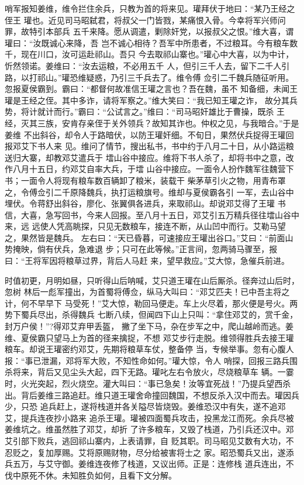 哨军报知姜维，维令拦住余兵，只教为首的将来见。瓘拜伏于地曰：“某乃王经之侄王
瓘也。近见司马昭弑君，将叔父一门皆戮，某痛恨入骨。今幸将军兴师问罪，故特引本部兵
五千来降。愿从调遣，剿除奸党，以报叔父之恨。”维大喜，谓瓘曰：“汝既诚心来降，吾
岂不诚心相待？吾军中所患者，不过粮耳。今有粮车数千，现在川口，汝可运赴祁山。吾只
今去取祁山寨也。”瓘心中大喜，以为中计，忻然领诺。姜维曰：“汝去运粮，不必用五千
人，但引三千人去，留下二千人引路，以打祁山。”瓘恐维疑惑，乃引三千兵去了。维令傅
佥引二千魏兵随征听用。忽报夏侯霸到。霸曰：“都督何故准信王瓘之言也？吾在魏，虽不
知备细，未闻王瓘是王经之侄。其中多诈，请将军察之。”维大笑曰：“我已知王瓘之诈，
故分其兵势，将计就计而行。”霸曰：“公试言之。”维曰：“司马昭奸雄比于曹操，既杀
王经，灭其三族，安肯存亲侄于关外领兵？故知其诈也。仲权之见，与我暗合。”于是姜维
不出斜谷，却令人于路暗伏，以防王瓘奸细。不旬日，果然伏兵捉得王瓘回报邓艾下书人来
见。维问了情节，搜出私书，书中约于八月二十日，从小路运粮送归大寨，却教邓艾遣兵于
墵山谷中接应。维将下书人杀了，却将书中之意，改作八月十五日，约邓艾自率大兵，于墵
山谷中接应。一面令人扮作魏军往魏营下书；一面令人将现有粮车数百辆卸了粮米，装载干
柴茅草引火之物，用青布罩之，令傅佥引二千原降魏兵，执打运粮旗号。维却与夏侯霸各引
一军，去山谷中埋伏。令蒋舒出斜谷，廖化、张翼俱各进兵，来取祁山。却说邓艾得了王瓘
书信，大喜，急写回书，今来人回报。至八月十五日，邓艾引五万精兵径往墵山谷中来，远
远使人凭高眺探，只见无数粮车，接连不断，从山凹中而行。艾勒马望之，果然皆是魏兵。
左右曰：“天已昏暮，可速接应王瓘出谷口。”艾曰：“前面山势掩映，倘有伏兵，急难退
步；只可在此等候。”正言间，忽两骑马骤至，报曰：“王将军因将粮草过界，背后人马赶
来，望早救应。”艾大惊，急催兵前进。

时值初更，月明如昼，只听得山后呐喊，艾只道王瓘在山后厮杀。径奔过山后时，忽树
林后一彪军撞出，为首蜀将傅佥，纵马大叫曰：“邓艾匹夫！已中吾主将之计，何不早早下
马受死！”艾大惊，勒回马便走。车上火尽着，那火便是号火。两势下蜀兵尽出，杀得魏兵
七断八续，但闻四下山上只叫：“拿住邓艾的，赏千金，封万户侯！”?得邓艾弃甲丢盔，
撇了坐下马，杂在步军之中，爬山越岭而逃。姜维、夏侯霸只望马上为首的径来擒捉，不想
邓艾步行走脱。维领得胜兵去接王瓘粮车。却说王瓘密约邓艾，先期将粮草车仗，整备停
当，专候举事。忽有心腹人报：“事已泄漏，邓将军大败，不知性命如何。”瓘大惊，令人
哨探，回报三路兵围杀将来，背后又见尘头大起，四下无路。瓘叱左右令放火，尽烧粮草车
辆。一霎时，火光突起，烈火烧空。灌大叫曰：“事已急矣！汝等宜死战！”乃提兵望西杀
出。背后姜维三路追赶。维只道王瓘舍命撞回魏国，不想反杀入汉中而去。瓘因兵少，只恐
追兵赶上，遂将栈道并各关隘尽皆烧毁。姜维恐汉中有失，遂不追邓艾，提兵连夜抄小路来
追杀王瓘。瓘被四面蜀兵攻击，投黑龙江而死。余兵尽被姜维坑之。维虽然胜了邓艾，却折
了许多粮车，又毁了栈道，乃引兵还汉中。邓艾引部下败兵，逃回祁山寨内，上表请罪，自
贬其职。司马昭见艾数有大功，不忍贬之，复加厚赐。艾将原赐财物，尽分给被害将士之
家。昭恐蜀兵又出，遂添兵五万，与艾守御。姜维连夜修了栈道，又议出师。正是：连修栈
道兵连出，不伐中原死不休。未知胜负如何，且看下文分解。